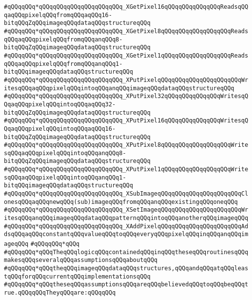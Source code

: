 \verb|#qQQqqQQq*qQQqqQQqqQQqqQQqqQQqqQQq_XGetPixel16qQQqqQQqqQQqqQQqReadsqQQqaqQQqpixelqQQqfromqQQqaqQQq16-bitqQQqZqQQqimageqQQqdataqQQqstructureqQQq|\newline
\verb|#qQQqqQQq*qQQqqQQqqQQqqQQqqQQqqQQq_XGetPixel8qQQqqQQqqQQqqQQqqQQqReadsqQQqaqQQqpixelqQQqfromqQQqanqQQq8-bitqQQqZqQQqimageqQQqdataqQQqstructureqQQq|\newline
\verb|#qQQqqQQq*qQQqqQQqqQQqqQQqqQQqqQQq_XGetPixel1qQQqqQQqqQQqqQQqqQQqReadsqQQqaqQQqpixelqQQqfromqQQqanqQQq1-bitqQQqimageqQQqdataqQQqstructureqQQq|\newline
\verb|#qQQqqQQq*qQQqqQQqqQQqqQQqqQQqqQQq_XPutPixelqQQqqQQqqQQqqQQqqQQqqQQqWritesqQQqaqQQqpixelqQQqintoqQQqanqQQqimageqQQqdataqQQqstructureqQQq|\newline
\verb|#qQQqqQQq*qQQqqQQqqQQqqQQqqQQqqQQq_XPutPixel32qQQqqQQqqQQqqQQqWritesqQQqaqQQqpixelqQQqintoqQQqaqQQq32-bitqQQqZqQQqimageqQQqdataqQQqstructureqQQq|\newline
\verb|#qQQqqQQq*qQQqqQQqqQQqqQQqqQQqqQQq_XPutPixel16qQQqqQQqqQQqqQQqWritesqQQqaqQQqpixelqQQqintoqQQqaqQQq16-bitqQQqZqQQqimageqQQqdataqQQqstructureqQQq|\newline
\verb|#qQQqqQQq*qQQqqQQqqQQqqQQqqQQqqQQq_XPutPixel8qQQqqQQqqQQqqQQqqQQqWritesqQQqaqQQqpixelqQQqintoqQQqanqQQq8-bitqQQqZqQQqimageqQQqdataqQQqstructureqQQq|\newline
\verb|#qQQqqQQq*qQQqqQQqqQQqqQQqqQQqqQQq_XPutPixel1qQQqqQQqqQQqqQQqqQQqWritesqQQqaqQQqpixelqQQqintoqQQqanqQQq1-bitqQQqimageqQQqdataqQQqstructureqQQq|\newline
\verb|#qQQqqQQq*qQQqqQQqqQQqqQQqqQQqqQQq_XSubImageqQQqqQQqqQQqqQQqqQQqqQQqClonesqQQqaqQQqnewqQQq(sub)imageqQQqfromqQQqanqQQqexistingqQQqoneqQQq|\newline
\verb|#qQQqqQQq*qQQqqQQqqQQqqQQqqQQqqQQq_XSetImageqQQqqQQqqQQqqQQqqQQqqQQqWritesqQQqanqQQqimageqQQqdataqQQqpatternqQQqintoqQQqanotherqQQqimageqQQq|\newline
\verb|#qQQqqQQq*qQQqqQQqqQQqqQQqqQQqqQQq_XAddPixelqQQqqQQqqQQqqQQqqQQqqQQqAddsqQQqaqQQqconstantqQQqvalueqQQqtoqQQqeveryqQQqpixelqQQqinqQQqanqQQqimageqQQq|\newline
\verb|#qQQqqQQq*qQQq|\newline
\verb|#qQQqqQQq*qQQqTheqQQqlogicqQQqcontainedqQQqinqQQqtheseqQQqroutinesqQQqmakesqQQqseveralqQQqassumptionsqQQqaboutqQQq|\newline
\verb|#qQQqqQQq*qQQqtheqQQqimageqQQqdataqQQqstructures,qQQqandqQQqatqQQqleastqQQqforqQQqcurrentqQQqimplementationsqQQq|\newline
\verb|#qQQqqQQq*qQQqtheseqQQqassumptionsqQQqareqQQqbelievedqQQqtoqQQqbeqQQqtrue.qQQqqQQqTheyqQQqare:qQQqqQQq|\newline
